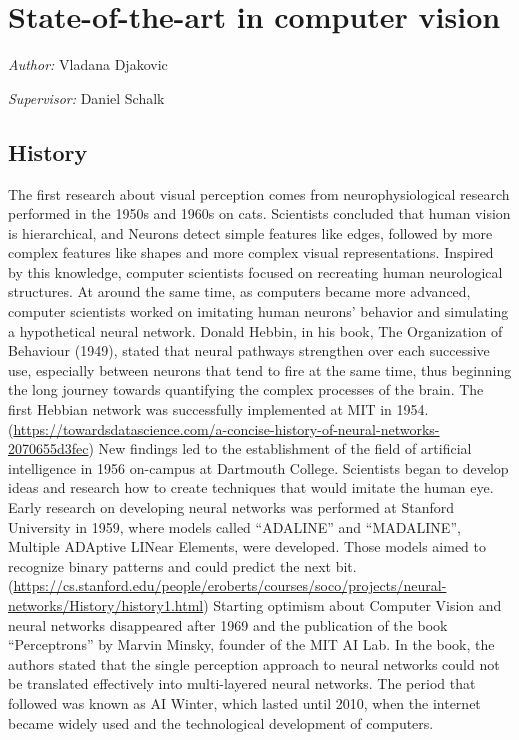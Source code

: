 \documentclass[
]{krantz}
\begin{document}
\hypertarget{state-of-the-art-in-computer-vision}{%
\section{State-of-the-art in computer vision}\label{state-of-the-art-in-computer-vision}}

\emph{Author: } Vladana Djakovic

\emph{Supervisor:} Daniel Schalk

\hypertarget{history}{%
\subsection{History}\label{history}}

The first research about visual perception comes from neurophysiological research performed in the 1950s and 1960s on cats. Scientists concluded that human vision is hierarchical, and Neurons detect simple features like edges, followed by more complex features like shapes and more complex visual representations. Inspired by this knowledge, computer scientists focused on recreating human neurological structures.
At around the same time, as computers became more advanced, computer scientists worked on imitating human neurons' behavior and simulating a hypothetical neural network. Donald Hebbin, in his book, The Organization of Behaviour (1949), stated that neural pathways strengthen over each successive use, especially between neurons that tend to fire at the same time, thus beginning the long journey towards quantifying the complex processes of the brain. The first Hebbian network was successfully implemented at MIT in 1954. (\url{https://towardsdatascience.com/a-concise-history-of-neural-networks-2070655d3fec})
New findings led to the establishment of the field of artificial intelligence in 1956 on-campus at Dartmouth College. Scientists began to develop ideas and research how to create techniques that would imitate the human eye.
Early research on developing neural networks was performed at Stanford University in 1959, where models called ``ADALINE'' and ``MADALINE'', Multiple ADAptive LINear Elements, were developed. Those models aimed to recognize binary patterns and could predict the next bit. (\url{https://cs.stanford.edu/people/eroberts/courses/soco/projects/neural-networks/History/history1.html})
Starting optimism about Computer Vision and neural networks disappeared after 1969 and the publication of the book ``Perceptrons'' by Marvin Minsky, founder of the MIT AI Lab. In the book, the authors stated that the single perception approach to neural networks could not be translated effectively into multi-layered neural networks. The period that followed was known as AI Winter, which lasted until 2010, when the internet became widely used and the technological development of computers.
\end{document}
